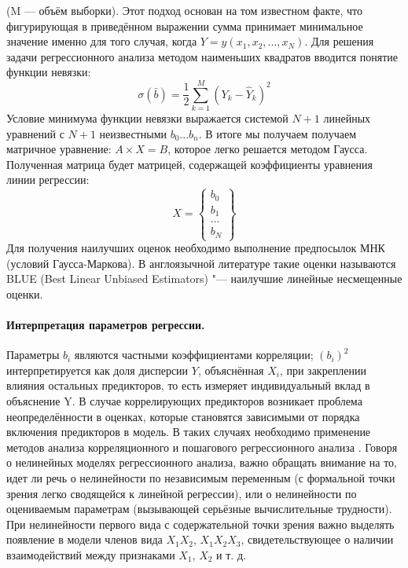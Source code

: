 (M — объём выборки). Этот подход основан на том известном факте, что фигурирующая в приведённом выражении сумма принимает минимальное значение именно для того случая, когда $Y = y(x_1,x_2,...,x_N)$.
Для решения задачи регрессионного анализа методом наименьших квадратов вводится понятие функции невязки:
\begin{equation*}
\sigma(\bar{b}) = \frac{1}{2} \sum\limits_{k=1}^{M}{(Y_k - \hat{Y}_k)^2}
\end{equation*}
Условие минимума функции невязки выражается системой $N+1$  линейных уравнений с $N+1$ неизвестными $b_0...b_n$.
В итоге мы получаем получаем матричное уравнение: $A \times X = B$, которое легко решается методом Гаусса. Полученная матрица будет матрицей, содержащей коэффициенты уравнения линии регрессии:
\begin{equation*}
X = \left\{ \begin{array}{c}
b_0\\
b_1\\
...\\
b_N
\end{array} \right\}
\end{equation*}
Для получения наилучших оценок необходимо выполнение предпосылок МНК (условий Гаусса-Маркова). В англоязычной литературе такие оценки называются BLUE (Best Linear Unbiased Estimators) "--- наилучшие линейные несмещенные оценки.

\paragraph{Интерпретация параметров регрессии.}

Параметры $b_i$ являются частными коэффициентами корреляции; $(b_i)^2$ интерпретируется как доля дисперсии $Y$, объяснённая $X_i$, при закреплении влияния остальных предикторов, то есть измеряет индивидуальный вклад  в объяснение Y. В случае коррелирующих предикторов возникает проблема неопределённости в оценках, которые становятся зависимыми от порядка включения предикторов в модель. В таких случаях необходимо применение методов анализа корреляционного и пошагового регрессионного анализа \cite{statseval}.
Говоря о нелинейных моделях регрессионного анализа, важно обращать внимание на то, идет ли речь о нелинейности по независимым переменным (с формальной точки зрения легко сводящейся к линейной регрессии), или о нелинейности по оцениваемым параметрам (вызывающей серьёзные вычислительные трудности). При нелинейности первого вида с содержательной точки зрения важно выделять появление в модели членов вида $X_1 X_2$, $X_1 X_2 X_3$, свидетельствующее о наличии взаимодействий между признаками $X_1$, $X_2$ и т. д.

